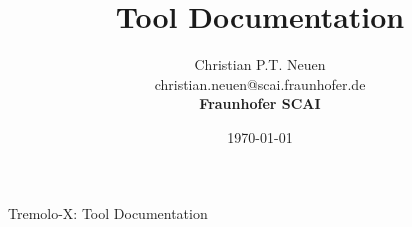 \documentclass[a4paper, 11pt]{report}
\date{\today}
\title{Tool Documentation}
\author{Christian P.T. Neuen\\christian.neuen@scai.fraunhofer.de\\{\Large{}\bf Fraunhofer SCAI}}
\begin{document}
{\huge Tremolo-X: Tool Documentation}
\bigbreak







%
%







\end{document}
